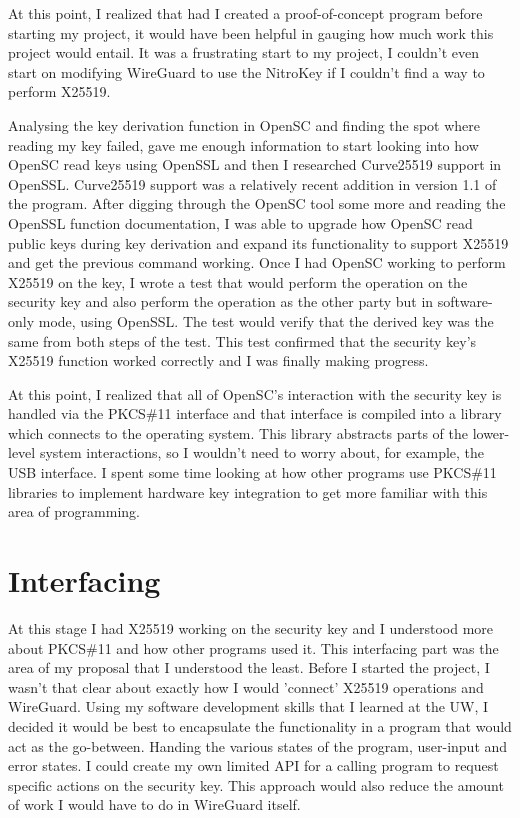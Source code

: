\documentclass [11pt, proquest] {uwthesis}[2020/02/24]
\begin{document}
At this point, I realized that had I created a proof-of-concept program before starting my project, it would have been helpful in gauging how much work this project would entail. It was a frustrating start to my project, I couldn't even start on modifying WireGuard to use the NitroKey if I couldn't find a way to perform X25519.

Analysing the key derivation function in OpenSC and finding the spot where reading my key failed, gave me enough information to start looking into how OpenSC read keys using OpenSSL and then I researched Curve25519 support in OpenSSL. Curve25519 support was a relatively recent addition in version 1.1 of the program\cite{noauthor_support_nodate}.
After digging through the OpenSC tool some more and reading the OpenSSL function documentation, I was able to upgrade how OpenSC read public keys during key derivation and expand its functionality to support X25519 and get the previous command working.
Once I had OpenSC working to perform X25519 on the key, I wrote a test that would perform the operation on the security key and also perform the operation as the other party but in software-only mode, using OpenSSL. The test would verify that the derived key was the same from both steps of the test. This test confirmed that the security key's X25519 function worked correctly and I was finally making progress.

At this point, I realized that all of OpenSC's interaction with the security key is handled via the PKCS\#11 interface and that interface is compiled into a library which connects to the operating system. This library abstracts parts of the lower-level system interactions, so I wouldn't need to worry about, for example, the USB interface. I spent some time looking at how other programs use PKCS\#11 libraries to implement hardware key integration to get more familiar with this area of programming.

\section{Interfacing}
At this stage I had X25519 working on the security key and I understood more about PKCS\#11 and how other programs used it. This interfacing part was the area of my proposal that I understood the least. Before I started the project, I wasn't that clear about exactly how I would 'connect' X25519 operations and WireGuard. Using my software development skills that I learned at the UW, I decided it would be best to encapsulate the functionality in a program that would act as the go-between. Handing the various states of the program, user-input and error states. I could create my own limited API for a calling program to request specific actions on the security key. This approach would also reduce the amount of work I would have to do in WireGuard itself.
\end{document}
